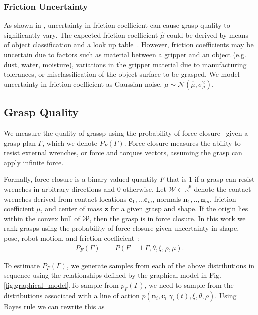 \documentclass[journal,transmag]{IEEEtran}%
\newcommand{\bc}{\mathbf{c}}
\newcommand{\bn}{\mathbf{n}}
\newcommand{\bz}{\mathbf{z}}
\newcommand{\mN}{\mathcal{N}}
\newcommand{\mW}{\mathcal{W}}
\begin{document}
 \subsubsection{Friction Uncertainty}
As shown in \cite{zheng2005}, uncertainty in friction coefficient can cause grasp quality to significantly vary.
The expected friction coefficient $\hat{\mu}$ could be derived by means of object classification and a look up table~\cite{}.
However, friction coefficients may be uncertain due to factors such as material between a gripper and an object (e.g. dust, water, moisture), variations in the gripper material due to manufacturing tolerances, or misclassification of the object surface to be grasped.
We model uncertainty in friction coefficient as Gaussian noise, $\mu \sim \mN(\hat{\mu},\sigma_{\mu}^2)$. 
 
\subsection{Grasp Quality}\label{sec:grasp_sample}
We measure the quality of grassp using the probability of force closure~\cite{weisz2012pose, kim2012physically, kehoe2012estimating, kehoe2012toward} given a grasp plan $\Gamma$, which we denote $P_F(\Gamma)$.
Force closure measures the ability to resist external wrenches, or force and torques vectors, assuming the grasp can apply infinite force.

Formally, force closure is a binary-valued quantity $F$ that is 1 if a grasp can resist wrenches in arbitrary directions and 0 otherwise.
Let $\mW \in \mathbb{R}^6$ denote the contact wrenches derived from contact locations $\bc_1, ... \bc_m$, normals $\bn_1, .., \bn_m$, friction coefficient $\mu$, and center of mass $\bz$ for a given grasp and shape.
If the origin lies within the convex hull of $\mW$, then the grasp is in force closure\cite{li1988task}.
In this work we rank grasps using the probability of force closure given uncertainty in shape, pose, robot motion, and friction coefficient~\cite{christopoulos2007handling, kehoe2012toward}:
\begin{align*}
	P_F(\Gamma) &= P(F = 1 | \Gamma, \theta, \xi, \rho, \mu).
\end{align*}
 
To estimate $P_F(\Gamma)$, we generate  samples from each of the above distributions in sequence using the relationships defined by the graphical model in Fig. \ref{fig:graphical_model}.To sample from $p_F(\Gamma)$, we need to sample from the distributions associated with a line of action $p(\textbf{n}_i,\textbf{c}_i|\gamma_i(t),\xi,\theta, \rho)$. Using Bayes rule  we can rewrite this as 
 
\end{document}
